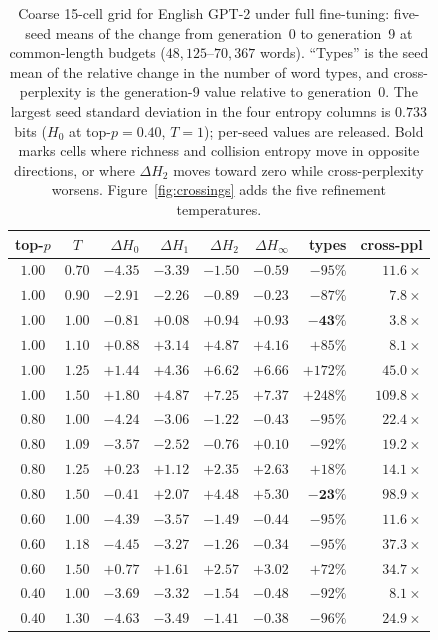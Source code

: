 \documentclass[10pt]{article}
\theoremstyle{plain}
\theoremstyle{definition}
\newcommand{\Htwo}{H_2}
\newcommand{\Hz}{H_0}
\newcommand{\Hinf}{H_\infty}
\begin{document}
\begin{table}[t]
\centering\small
\caption{Coarse 15-cell grid for English GPT-2 under full fine-tuning: five-seed means of the
change from generation~0 to generation~9 at common-length budgets ($48{,}125$--$70{,}367$
words). ``Types'' is the seed mean of the relative change in the number of word types, and
cross-perplexity is the generation-9 value relative to generation~0. The largest seed standard
deviation in the four entropy columns is $0.733$ bits ($\Hz$ at top-$p=0.40$, $T=1$); per-seed
values are released. Bold marks cells where richness and collision entropy move in opposite
directions, or where $\Delta\Htwo$ moves toward zero while cross-perplexity worsens.
Figure~\ref{fig:crossings} adds the five refinement temperatures.}
\label{tab:crossings}
\begin{tabular}{cc rrrr rr}
\toprule
top-$p$ & $T$ & $\Delta\Hz$ & $\Delta H_1$ & $\Delta\Htwo$ & $\Delta\Hinf$ & types & cross-ppl \\
\midrule
$1.00$ & $0.70$ & $-4.35$ & $-3.39$ & $-1.50$ & $-0.59$ & $-95\%$ & $11.6\times$ \\
$1.00$ & $0.90$ & $-2.91$ & $-2.26$ & $-0.89$ & $-0.23$ & $-87\%$ & $7.8\times$ \\
$1.00$ & $1.00$ & $\mathbf{-0.81}$ & $+0.08$ & $\mathbf{+0.94}$ & $+0.93$ & $\mathbf{-43\%}$ & $3.8\times$ \\
$1.00$ & $1.10$ & $+0.88$ & $+3.14$ & $+4.87$ & $+4.16$ & $+85\%$ & $8.1\times$ \\
$1.00$ & $1.25$ & $+1.44$ & $+4.36$ & $+6.62$ & $+6.66$ & $+172\%$ & $45.0\times$ \\
$1.00$ & $1.50$ & $+1.80$ & $+4.87$ & $+7.25$ & $+7.37$ & $+248\%$ & $109.8\times$ \\
\midrule
$0.80$ & $1.00$ & $-4.24$ & $-3.06$ & $-1.22$ & $-0.43$ & $-95\%$ & $22.4\times$ \\
$0.80$ & $1.09$ & $-3.57$ & $-2.52$ & $-0.76$ & $+0.10$ & $-92\%$ & $19.2\times$ \\
$0.80$ & $1.25$ & $+0.23$ & $+1.12$ & $+2.35$ & $+2.63$ & $+18\%$ & $14.1\times$ \\
$0.80$ & $1.50$ & $\mathbf{-0.41}$ & $+2.07$ & $\mathbf{+4.48}$ & $+5.30$ & $\mathbf{-23\%}$ & $98.9\times$ \\
\midrule
$0.60$ & $1.00$ & $-4.39$ & $-3.57$ & $-1.49$ & $-0.44$ & $-95\%$ & $11.6\times$ \\
$0.60$ & $1.18$ & $-4.45$ & $-3.27$ & $\mathbf{-1.26}$ & $-0.34$ & $-95\%$ & $\mathbf{37.3\times}$ \\
$0.60$ & $1.50$ & $+0.77$ & $+1.61$ & $+2.57$ & $+3.02$ & $+72\%$ & $34.7\times$ \\
\midrule
$0.40$ & $1.00$ & $-3.69$ & $-3.32$ & $-1.54$ & $-0.48$ & $-92\%$ & $8.1\times$ \\
$0.40$ & $1.30$ & $-4.63$ & $-3.49$ & $\mathbf{-1.41}$ & $-0.38$ & $-96\%$ & $\mathbf{24.9\times}$ \\
\bottomrule
\end{tabular}
\end{table}
\end{document}
